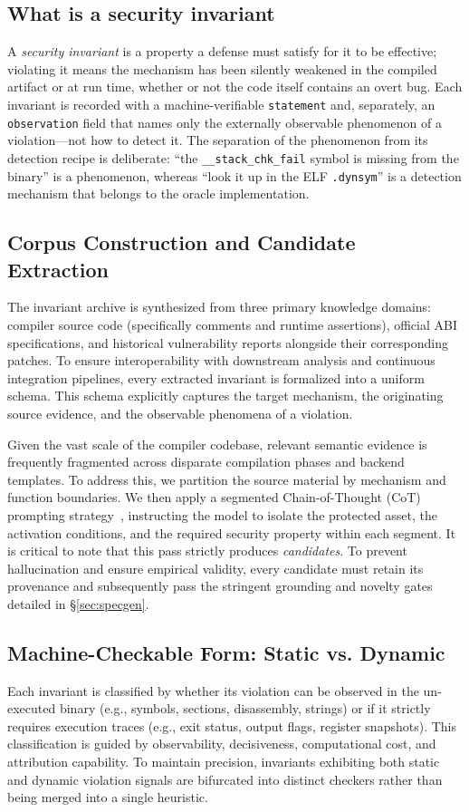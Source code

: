 \documentclass[conference]{IEEEtran}
\begin{document}
\subsection{What is a security invariant}
A \emph{security invariant} is a property a defense must satisfy for it to be
effective; violating it means the mechanism has been silently weakened in the
compiled artifact or at run time, whether or not the code itself contains an
overt bug. Each invariant is recorded with a machine-verifiable
\texttt{statement} and, separately, an \texttt{observation} field that names
only the externally observable phenomenon of a violation---not how to detect it.
The separation of the phenomenon from its detection recipe is deliberate: ``the
\texttt{\_\_stack\_chk\_fail} symbol is missing from the binary'' is a
phenomenon, whereas ``look it up in the ELF \texttt{.dynsym}'' is a detection
mechanism that belongs to the oracle implementation.

\subsection{Corpus Construction and Candidate Extraction}
The invariant archive is synthesized from three primary knowledge domains: compiler source code (specifically comments and runtime assertions), official ABI specifications, and historical vulnerability reports alongside their corresponding patches. To ensure interoperability with downstream analysis and continuous integration pipelines, every extracted invariant is formalized into a uniform schema. This schema explicitly captures the target mechanism, the originating source evidence, and the observable phenomena of a violation.

Given the vast scale of the compiler codebase, relevant semantic evidence is frequently fragmented across disparate compilation phases and backend templates. To address this, we partition the source material by mechanism and function boundaries. We then apply a segmented Chain-of-Thought (CoT) prompting strategy~\cite{wei2022chain}, instructing the model to isolate the protected asset, the activation conditions, and the required security property within each segment. It is critical to note that this pass strictly produces \emph{candidates}. To prevent hallucination and ensure empirical validity, every candidate must retain its provenance and subsequently pass the stringent grounding and novelty gates detailed in \S\ref{sec:specgen}.

\subsection{Machine-Checkable Form: Static vs. Dynamic}
Each invariant is classified by whether its violation can be observed in the un-executed binary (e.g., symbols, sections, disassembly, strings) or if it strictly requires execution traces (e.g., exit status, output flags, register snapshots). This classification is guided by observability, decisiveness, computational cost, and attribution capability. To maintain precision, invariants exhibiting both static and dynamic violation signals are bifurcated into distinct checkers rather than being merged into a single heuristic.
\end{document}
